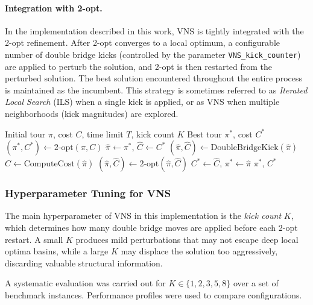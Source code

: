 \documentclass{article}
\begin{document}
\paragraph{Integration with 2-opt.}
In the implementation described in this work, VNS is tightly integrated with the 2-opt
refinement. After 2-opt converges to a local optimum, a configurable number of double
bridge kicks (controlled by the parameter \texttt{VNS\_kick\_counter}) are applied to
perturb the solution, and 2-opt is then restarted from the perturbed solution. The best
solution encountered throughout the entire process is maintained as the incumbent. This
strategy is sometimes referred to as \textit{Iterated Local Search} (ILS) when a single kick
is applied, or as VNS when multiple neighborhoods (kick magnitudes) are explored.

\begin{algorithm}[H]
\caption{VNS for TSP (integrated with 2-opt)}
\label{alg:vns}
\begin{algorithmic}[1]
\Require Initial tour $\pi$, cost $C$, time limit $T$, kick count $K$
\Ensure Best tour $\pi^*$, cost $C^*$
\State $(\pi^*, C^*) \leftarrow \text{2-opt}(\pi, C)$
    \State $\hat{\pi} \leftarrow \pi^*$, $\hat{C} \leftarrow C^*$
        \State $(\hat{\pi}, \hat{C}) \leftarrow \text{DoubleBridgeKick}(\hat{\pi})$
        \State $\hat{C} \leftarrow \text{ComputeCost}(\hat{\pi})$
    \EndFor
    \State $(\hat{\pi}, \hat{C}) \leftarrow \text{2-opt}(\hat{\pi}, \hat{C})$
        \State $C^* \leftarrow \hat{C}$, $\pi^* \leftarrow \hat{\pi}$
    \EndIf
\EndWhile
\State \Return $\pi^*$, $C^*$
\end{algorithmic}
\end{algorithm}

\subsubsection{Hyperparameter Tuning for VNS}

The main hyperparameter of VNS in this implementation is the \textit{kick count} $K$, which
determines how many double bridge moves are applied before each 2-opt restart. A small $K$
produces mild perturbations that may not escape deep local optima basins, while a large $K$
may displace the solution too aggressively, discarding valuable structural information.

A systematic evaluation was carried out for $K \in \{1, 2, 3, 5, 8\}$ over a set of
benchmark instances. Performance profiles were used to compare configurations.
\end{document}

